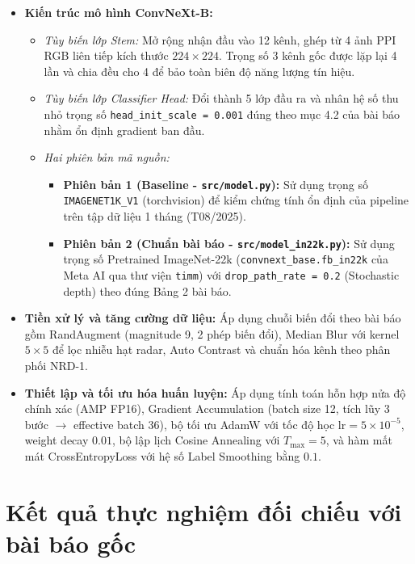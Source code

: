 \documentclass[12pt, a4paper]{article}
\begin{document}
\begin{itemize}[leftmargin=*]
    \item \textbf{Kiến trúc mô hình ConvNeXt-B:}
    \begin{itemize}
        \item \textit{Tùy biến lớp Stem:} Mở rộng nhận đầu vào 12 kênh, ghép từ 4 ảnh PPI RGB liên tiếp kích thước $224 \times 224$. Trọng số 3 kênh gốc được lặp lại 4 lần và chia đều cho 4 để bảo toàn biên độ năng lượng tín hiệu.
        \item \textit{Tùy biến lớp Classifier Head:} Đổi thành 5 lớp đầu ra và nhân hệ số thu nhỏ trọng số \texttt{head\_init\_scale = 0.001} đúng theo mục 4.2 của bài báo nhằm ổn định gradient ban đầu.
        \item \textit{Hai phiên bản mã nguồn:}
        \begin{itemize}
            \item \textbf{Phiên bản 1 (Baseline - \texttt{src/model.py}):} Sử dụng trọng số \texttt{IMAGENET1K\_V1} (torchvision) để kiểm chứng tính ổn định của pipeline trên tập dữ liệu 1 tháng (T08/2025).
            \item \textbf{Phiên bản 2 (Chuẩn bài báo - \texttt{src/model\_in22k.py}):} Sử dụng trọng số Pretrained ImageNet-22k (\texttt{convnext\_base.fb\_in22k} của Meta AI qua thư viện \texttt{timm}) với \texttt{drop\_path\_rate = 0.2} (Stochastic depth) theo đúng Bảng 2 bài báo.
        \end{itemize}
    \end{itemize}
    \item \textbf{Tiền xử lý và tăng cường dữ liệu:} Áp dụng chuỗi biến đổi theo bài báo gồm RandAugment (magnitude 9, 2 phép biến đổi), Median Blur với kernel $5 \times 5$ để lọc nhiễu hạt radar, Auto Contrast và chuẩn hóa kênh theo phân phối NRD-1.
    \item \textbf{Thiết lập và tối ưu hóa huấn luyện:} Áp dụng tính toán hỗn hợp nửa độ chính xác (AMP FP16), Gradient Accumulation (batch size 12, tích lũy 3 bước $\to$ effective batch 36), bộ tối ưu AdamW với tốc độ học $\mathrm{lr} = 5 \times 10^{-5}$, weight decay $0.01$, bộ lập lịch Cosine Annealing với $T_{\max} = 5$, và hàm mất mát CrossEntropyLoss với hệ số Label Smoothing bằng $0.1$.
\end{itemize}

\section{Kết quả thực nghiệm đối chiếu với bài báo gốc}
\end{document}
